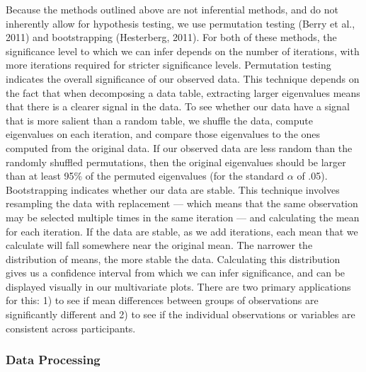 \documentclass[
  english,
  man,floatsintext]{apa6}
\begin{document}
Because the methods outlined above are not inferential methods, and do not inherently allow for hypothesis testing, we use permutation testing (Berry et al., 2011) and bootstrapping (Hesterberg, 2011). For both of these methods, the significance level to which we can infer depends on the number of iterations, with more iterations required for stricter significance levels.
Permutation testing indicates the overall significance of our observed data. This technique depends on the fact that when decomposing a data table, extracting larger eigenvalues means that there is a clearer signal in the data. To see whether our data have a signal that is more salient than a random table, we shuffle the data, compute eigenvalues on each iteration, and compare those eigenvalues to the ones computed from the original data. If our observed data are less random than the randomly shuffled permutations, then the original eigenvalues should be larger than at least 95\% of the permuted eigenvalues (for the standard \(\alpha\) of .05).
Bootstrapping indicates whether our data are stable. This technique involves resampling the data with replacement --- which means that the same observation may be selected multiple times in the same iteration --- and calculating the mean for each iteration. If the data are stable, as we add iterations, each mean that we calculate will fall somewhere near the original mean. The narrower the distribution of means, the more stable the data. Calculating this distribution gives us a confidence interval from which we can infer significance, and can be displayed visually in our multivariate plots. There are two primary applications for this: 1) to see if mean differences between groups of observations are significantly different and 2) to see if the individual observations or variables are consistent across participants.

\hypertarget{data-processing}{%
\subsubsection{Data Processing}\label{data-processing}}
\end{document}
